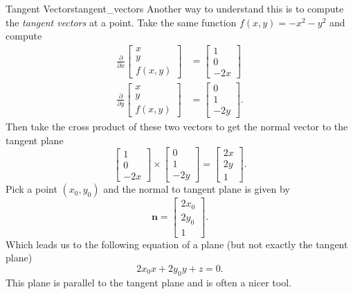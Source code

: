         \begin{ex}{Tangent Vectors}{tangent_vectors}
        Another way to understand this is to compute the \emph{tangent vectors} at a point. Take the same function $f(x,y)=-x^2-y^2$ and compute
        \begin{align*}
            \frac{\partial}{\partial x}\begin{bmatrix} x \\ y \\ f(x,y)\end{bmatrix} &= \begin{bmatrix} 1\\ 0 \\ -2x\end{bmatrix}\\
            \frac{\partial}{\partial y}\begin{bmatrix} x \\ y \\ f(x,y)\end{bmatrix} &= \begin{bmatrix} 0\\ 1 \\ -2y\end{bmatrix}.
        \end{align*}
        Then take the cross product of these two vectors to get the normal vector to the tangent plane
        \[
        \begin{bmatrix} 1 \\ 0 \\-2x\end{bmatrix} \times \begin{bmatrix} 0 \\ 1 \\ -2y\end{bmatrix} = \begin{bmatrix} 2x \\ 2y \\ 1\end{bmatrix}.
        \]
        Pick a point $(x_0,y_0)$ and the normal to tangent plane is given by
        \[
        \mathbf{n}=\begin{bmatrix} 2x_0 \\ 2y_0 \\ 1 \end{bmatrix}.
        \]
        Which leads us to the following equation of a plane (but not exactly the tangent plane)
        \[
        2x_0 x + 2y_0y+z=0.
        \]
        This plane is parallel to the tangent plane and is often a nicer tool.
        \end{ex}
        
